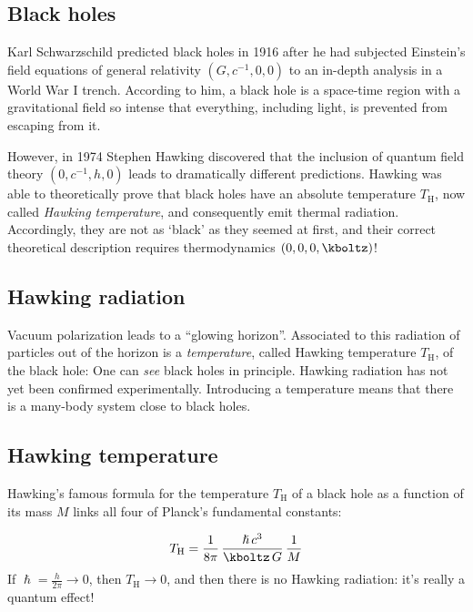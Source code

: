 \documentclass{scrartcl}
\begin{document}
\subsection*{Black holes}


Karl Schwarzschild predicted black holes in 1916 after he had subjected Einstein's field equations of general relativity $(G,c^{-1},0,0)$ to an in-depth analysis in a  World War I trench. According to him, a black hole is a space-time region with a gravitational field so intense that everything, including light, is prevented from escaping from it.

However, in 1974 Stephen Hawking discovered that the inclusion of quantum field theory $(0,c^{-1},h,0)$ leads to dramatically different predictions. Hawking was able to theoretically prove that black holes have an absolute temperature $T_\mathrm{H}$, now called \emph{Hawking temperature}, and consequently emit thermal radiation. Accordingly, they are not as \enquote*{black} as they seemed at first, and their correct theoretical description requires thermodynamics $(0,0,0,\kboltz)$!


\subsection*{Hawking radiation}

Vacuum polarization leads to a \enquote{glowing horizon}. Associated to this radiation of particles out of the horizon is a \emph{temperature}, called Hawking temperature $T_{\text{H}}$, of the black hole: One can \emph{see} black holes in principle. Hawking radiation has not yet been confirmed experimentally. Introducing a temperature means that there is a many-body system close to black holes. 


\subsection*{Hawking temperature}

Hawking's famous formula for the temperature $T_{\text{H}}$ of a black hole as a function of its mass $M$ links all four of Planck's fundamental constants:

\begin{equation*}\label{eq:HawkingT}
  T_{\text{H}} = \frac{1}{8 \pi}\, \frac{\hslash\, c^3}{\kboltz\, G}\, \frac{1}{M}
\end{equation*}
%
If $\hslash=\frac{h}{2\pi}\rightarrow0$, then $T_\text{H}\rightarrow0$, and then there is no Hawking radiation: it's really a quantum effect!
\end{document}
